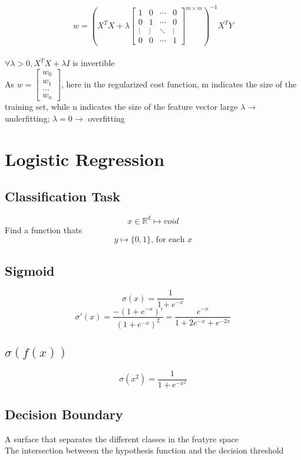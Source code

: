 \documentclass{article}
\begin{document}
\[w = (X^TX + \lambda \begin{bmatrix}
    1 & 0 & \cdots & 0 \\
    0 & 1 & \cdots & 0 \\
    \vdots & \vdots & \ddots & \vdots \\
    0 & 0 & \cdots  & 1
\end{bmatrix}^{m\times m}) ^{-1} X^TY\]\\
$\forall \lambda > 0, X^TX + \lambda I$ is invertible\\
As \(w = 
\begin{bmatrix}
    w_0 \\w_1 \\\dots \\w_n
\end{bmatrix}\), here in the regularized cost function, m indicates the size of the training set, while n indicates the size of the feature vector
large $\lambda \rightarrow$ underfitting; $\lambda = 0 \rightarrow$ overfitting 

\section{Logistic Regression}
\subsection*{Classification Task}
\[x \in \mathbb{R}^d \mapsto void\]
Find a function thats 
\[y \mapsto \{0, 1\} \text{, for each } x\]
\subsection*{Sigmoid}
\[\sigma(x) = \frac{1}{1 + e^{-x}}\]
\[\sigma'(x) = \frac{-(1 + e^{-x})'}{(1 + e^{-x})^2} = \frac{e^{-x}}{1 + 2e^{-x} + e^{-2x}}\]

\subsection*{$\sigma(f(x))$}
\[\sigma(x^2) = \frac{1}{1 + e^{-x^2}}\]

\subsection*{Decision Boundary}
A surface that separates the different classes in the featyre space \\
The intersection betweeen the hypothesis function and the decision threshold \\
\end{document}
